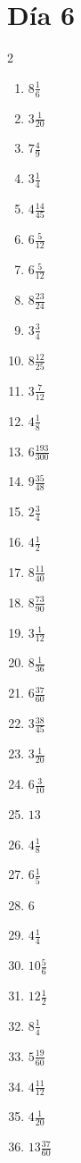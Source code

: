 \documentclass[12pt]{article}
\begin{document}
\section*{Día 6}
\begin{multicols}{2}\begin{enumerate}
\item $ 8 \frac{1}{6} $
\item $ 3 \frac{1}{20} $
\item $ 7 \frac{4}{9} $
\item $ 3 \frac{1}{4} $
\item $ 4 \frac{14}{45} $
\item $ 6 \frac{5}{12} $
\item $ 6 \frac{5}{12} $
\item $ 8 \frac{23}{24} $
\item $ 3 \frac{3}{4} $
\item $ 8 \frac{12}{25} $
\item $ 3 \frac{7}{12} $
\item $ 4 \frac{1}{8} $
\item $ 6 \frac{193}{300} $
\item $ 9 \frac{35}{48} $
\item $ 2 \frac{3}{4} $
\item $ 4 \frac{1}{2} $
\item $ 8 \frac{11}{40} $
\item $ 8 \frac{73}{90} $
\item $ 3 \frac{1}{12} $
\item $ 8 \frac{1}{36} $
\item $ 6 \frac{37}{60} $
\item $ 3 \frac{38}{45} $
\item $ 3 \frac{1}{20} $
\item $ 6 \frac{3}{10} $
\item $ 13 $
\item $ 4 \frac{1}{8} $
\item $ 6 \frac{1}{5} $
\item $ 6 $
\item $ 4 \frac{1}{4} $
\item $ 10 \frac{5}{6} $
\item $ 12 \frac{1}{2} $
\item $ 8 \frac{1}{4} $
\item $ 5 \frac{19}{60} $
\item $ 4 \frac{11}{12} $
\item $ 4 \frac{1}{20} $
\item $ 13 \frac{37}{60} $

\end{enumerate}
\end{multicols}
\end{document}
